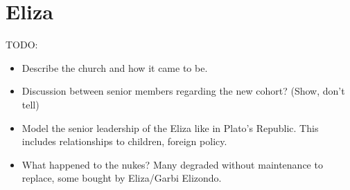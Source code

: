 %
%

\chapter{Eliza}

TODO:

\begin{itemize}
\item Describe the church and how it came to be.
\item Discussion between senior members regarding the new cohort? (Show, don't tell)
\item Model the senior leadership of the Eliza like in Plato's Republic. This includes relationships to children, foreign policy.
\item What happened to the nukes? Many degraded without maintenance to replace, some bought by Eliza/Garbi Elizondo.
\end{itemize}

\newpage
\thispagestyle{empty}
